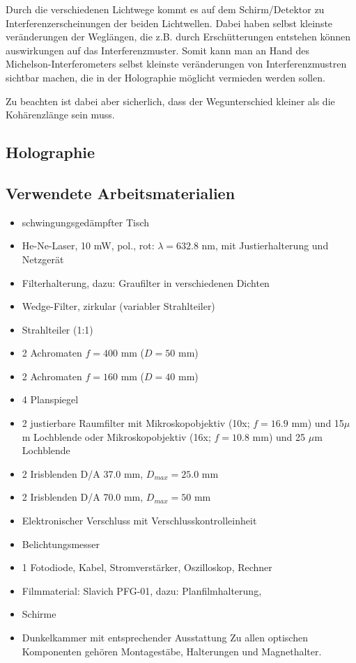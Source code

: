 Durch die verschiedenen Lichtwege kommt es auf dem Schirm/Detektor zu Interferenzerscheinungen der beiden Lichtwellen. Dabei haben selbst kleinste veränderungen der Weglängen, die z.B. durch Erschütterungen entstehen können auswirkungen auf das Interferenzmuster. Somit kann man an Hand des Michelson-Interferometers selbst kleinste veränderungen von Interferenzmustren sichtbar machen, die in der Holographie möglicht vermieden werden sollen.

Zu beachten ist dabei aber sicherlich, dass der Wegunterschied kleiner als die Kohärenzlänge sein muss.

\subsection{Holographie}

\newpage
\subsection{Verwendete Arbeitsmaterialien}
\begin{itemize}
\item schwingungsgedämpfter Tisch 
\item He-Ne-Laser, 10 mW, pol., rot: $\lambda = 632.8$ nm, mit Justierhalterung und Netzgerät 
\item Filterhalterung, dazu: Graufilter in verschiedenen Dichten 
\item Wedge-Filter, zirkular (variabler Strahlteiler) 
\item Strahlteiler (1:1) 
\item 2 Achromaten $f = 400$ mm ($D = 50$ mm) 
\item 2 Achromaten $f = 160$ mm ($D = 40$ mm) 
\item 4 Planspiegel 
\item 2 justierbare Raumfilter mit Mikroskopobjektiv (10x; $f = 16.9$ mm) und 15$\mu$m Lochblende oder Mikroskopobjektiv (16x; $f = 10.8$ mm) und 25 $\mu$m Lochblende 
\item 2 Irisblenden D/A 37.0 mm, $D_{max} = 25.0$ mm 
\item 2 Irisblenden D/A 70.0 mm, $D_{max} = 50$ mm 
\item Elektronischer Verschluss mit Verschlusskontrolleinheit 
\item Belichtungsmesser 
\item 1 Fotodiode, Kabel, Stromverstärker, Oszilloskop, Rechner 
\item Filmmaterial: Slavich PFG-01, dazu: Planfilmhalterung, 
\item Schirme 
\item Dunkelkammer mit entsprechender Ausstattung 
Zu allen optischen Komponenten gehören Montagestäbe, Halterungen und Magnethalter. 
\end{itemize}
